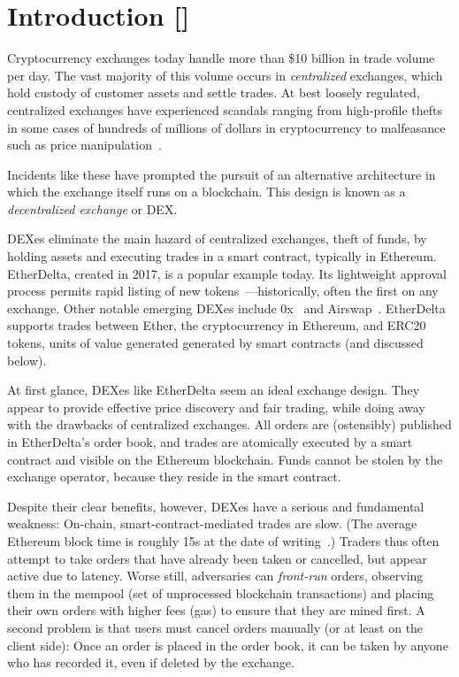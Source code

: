 \documentclass[conference]{IEEEtran}
\newcommand{\ari}[1]{\textsf{\color{blue}{[Ari: {#1}]}}}
\begin{document}
\section{Introduction [\color{red}{Ari}]}
\label{sec:intro}

Cryptocurrency exchanges today handle more than \$10 billion in trade volume per day. The vast majority of this volume occurs in {\em centralized} exchanges, which hold custody of customer assets and settle trades. At best loosely regulated, centralized exchanges have experienced scandals ranging from high-profile thefts~\cite{} in some cases of hundreds of millions of dollars in cryptocurrency to malfeasance such as price manipulation~\cite{gandal2018price}. 

Incidents like these have prompted the pursuit of an alternative architecture in which the exchange itself runs on a blockchain. This design is known as a {\em decentralized exchange} or DEX.



DEXes eliminate the main hazard of centralized exchanges, theft of funds, by holding assets and executing trades in a smart contract, typically in Ethereum. EtherDelta, created in 2017, is a popular example today. Its lightweight approval process permits rapid listing of new tokens~\cite{EtherDelta-listing:2018}---historically, often the first on any exchange. Other notable emerging DEXes include 0x~\cite{} and Airswap~\cite{}\ari{More? Upcoming Binance, etc.}.
EtherDelta supports trades between Ether, the cryptocurrency in Ethereum, and ERC20 tokens, units of value generated generated by smart contracts (and discussed below).

At first glance, DEXes like EtherDelta seem an ideal exchange design. They appear to provide effective price discovery and fair trading, while doing away with the drawbacks of centralized exchanges. All orders are (ostensibly) published in EtherDelta's order book, and trades are atomically executed by a smart contract and visible on the Ethereum blockchain. Funds cannot be stolen by the exchange operator, because they reside in the smart contract.


Despite their clear benefits, however, DEXes have a serious and fundamental weakness: On-chain, smart-contract-mediated trades are slow. (The average Ethereum block time is roughly 15s at the date of writing~\cite{Etherscan}.) Traders thus often attempt to take orders that have already been taken or cancelled, but appear active due to latency. Worse still, adversaries can {\em front-run} orders, observing them in the mempool (set of unprocessed blockchain transactions) and placing their own orders with higher fees (gas) to ensure that they are mined first. A second problem is that users must cancel orders manually (or at least on the client side): Once an order is placed in the order book, it can be taken by anyone who has recorded it, even if deleted by the exchange.
\end{document}
